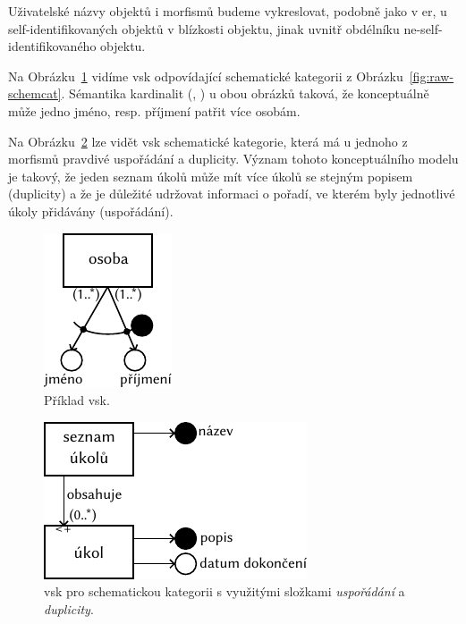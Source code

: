 Uživatelské názvy objektů i morfismů budeme vykreslovat, podobně jako v \acrshort{er}, u self-identifikovaných objektů v blízkosti objektu, jinak uvnitř obdélníku ne-self-identifikovaného objektu.

Na Obrázku~\ref{fig:schemcat-visualization-example} vidíme \acrshort{vsk} odpovídající schematické kategorii z Obrázku~\ref{fig:raw-schemcat}.
Sémantika kardinalit (\one, \many) u obou obrázků taková, že konceptuálně může jedno jméno, resp. příjmení patřit více osobám.

Na Obrázku~\ref{fig:scv-ord-dup} lze vidět \acrshort{vsk} schematické kategorie, která má u jednoho z morfismů pravdivé uspořádání a duplicity.
Význam tohoto konceptuálního modelu je takový, že jeden seznam úkolů může mít více úkolů se stejným popisem (duplicity) a že je důležité udržovat informaci o pořadí, ve kterém byly jednotlivé úkoly přidávány (uspořádání).

\begin{figure}[!htb]
  \centering
  \includegraphics[width=\maxwidth{\textwidth}]{../img/schemcat-diagrams/schemcat-visualization-example.pdf}
  \caption{Příklad \acrfull{vsk}.}
  \label{fig:schemcat-visualization-example}
\end{figure}

\begin{figure}[!htb]
  \centering
  \includegraphics[width=\maxwidth{\textwidth}]{../img/schemcat-diagrams/scv-ord-dup.pdf}
  \caption{\acrshort{vsk} pro schematickou kategorii s využitými složkami \emph{uspořádání} a \emph{duplicity}.}
  \label{fig:scv-ord-dup}
\end{figure}

